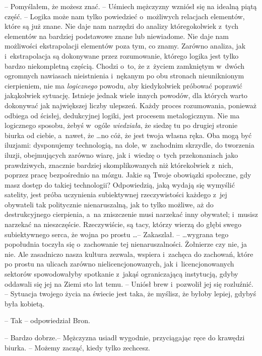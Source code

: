 \documentclass[oneside,polish,11pt,rmheadings]{mwbk}
\begin{document}
-- Pomyślałem, że możesz znać. -- Uśmiech mężczyzny wzniósł się na idealną piątą część. -- Logika może nam tylko powiedzieć o~możliwych relacjach elementów, które są już znane. Nie daje nam narzędzi do analizy któregokolwiek z~tych elementów na bardziej podstawowe znane lub niewiadome. Nie daje nam możliwości ekstrapolacji elementów poza tym, co znamy. Zarówno analiza, jak i~ekstrapolacja są dokonywane przez rozumowanie, którego logika jest tylko bardzo niekompletną częścią. Chodzi o~to, że z~życiem zamkniętym w~dwóch ogromnych nawiasach nieistnienia i~nękanym po obu stronach nieuniknionym cierpieniem, nie ma \textit{logicznego }powodu, aby kiedykolwiek próbować poprawić jakąkolwiek sytuację. Istnieje jednak wiele innych powodów, dla których warto dokonywać jak największej liczby ulepszeń. Każdy proces rozumowania, ponieważ odbiega od ścisłej, dedukcyjnej logiki, jest procesem metalogicznym. Nie ma logicznego sposobu, żebyś w~ogóle \textit{wiedziała}, że siedzę tu po drugiej stronie biurka od ciebie, a~nawet, że \ldots  no cóż, że jest twoja własna ręka. Oba mogą być iluzjami: dysponujemy technologią, na dole, w~zachodnim skrzydle, do tworzenia iluzji, obejmujących zarówno wiarę, jak i~wiedzę o~tych przekonaniach jako prawdziwych, znacznie bardziej skomplikowanych niż którekolwiek z~nich, poprzez pracę bezpośrednio na mózgu. Jakie są Twoje obowiązki społeczne, gdy masz dostęp do takiej technologii? Odpowiedzią, jaką wydają się wymyślić satelity, jest próba uczynienia subiektywnej rzeczywistości każdego z~jej obywateli tak politycznie nienaruszalną, jak to tylko możliwe, aż do destrukcyjnego cierpienia, a~na zniszczenie musi narzekać inny obywatel; i~musisz narzekać na nieszczęście. Rzeczywiście, są tacy, którzy wierzą do głębi swego subiektywnego serca, że wojna po prostu \ldots -- Zakaszlał. -- \ldots wygrana tego popołudnia toczyła się o~zachowanie tej nienaruszalności. Żołnierze czy nie, ja nie. Ale zasadniczo nasza kultura zezwala, wspiera i~zachęca do zachowań, które po prostu na ulicach zarówno nielicencjonowanych, jak i~licencjonowanych sektorów spowodowałyby spotkanie z~jakąś ograniczającą instytucją, gdyby oddawali się jej na Ziemi sto lat temu. -- Uniósł brew i~pozwolił jej się rozluźnić. -- Sytuacja twojego życia na świecie jest taka, że myślisz, że byłoby lepiej, gdybyś była kobietą. 

-- Tak -- odpowiedział Bron. 

-- Bardzo dobrze.--  Mężczyzna usiadł wygodnie, przyciągając ręce do krawędzi biurka. -- Możemy zacząć, kiedy tylko zechcesz. 
\end{document}
